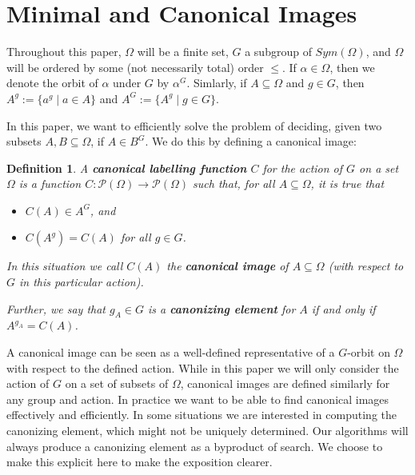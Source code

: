 \documentclass[preprint,12pt]{elsarticle}
\newtheorem{hyp}[theorem]{Hypothesis}
\newtheorem{defi}[theorem]{Definition}
\newcommand{\Sym}[1]{\ensuremath{Sym(#1)}}
\newcommand{\powset}{\mathcal{P}}
\begin{document}


\section{Minimal and Canonical Images}

Throughout this paper, $\Omega$ will be a finite set, $G$ a subgroup of
$\Sym{\Omega}$, and $\Omega$ will be ordered by some (not necessarily total)
order $\leq$.
If $\alpha \in \Omega$, then we denote the orbit of $\alpha$ under $G$ by $\alpha^G$.
Simlarly, if \(A \subseteq \Omega\) and $g \in G$, then 
\(A^g := \{a^g \mid a \in A\}\) and \(A^G := \{ A^g \mid g \in G \}\).

In this paper, we want to efficiently solve the problem of deciding, given two subsets
\(A,B \subseteq \Omega\), if \(A \in B^G\). We do this by defining a canonical image:

\begin{defi}
  A \textbf{canonical labelling function} $C$ for the action of $G$ on a set $\Omega$ is a function
  $C:\powset(\Omega) \rightarrow \powset(\Omega)$ such that, for all $A  \subseteq \Omega$,
  it is true that
  \begin{itemize}
  \item $C(A) \in A^G$, and
  \item ${C(A^g)} = C(A)$ for all $g \in G$.
  \end{itemize}

  In this situation we call $C(A)$ the \textbf{canonical image} of
  $A \subseteq  \Omega$ (with respect to $G$ in this particular action).

  Further, we say that $g_A \in G$ is a \textbf{canonizing element} for \(A\) if and only if
  $A^{g_A} = C(A)$.
\end{defi}


A canonical image can be seen as a well-defined
representative of a $G$-orbit on $\Omega$ with respect to the defined action. While in this
paper we will only consider the action of \(G\) on a set of subsets of \(\Omega\), canonical images are
defined similarly for any group and action.
In practice we want to be able to find canonical images effectively and
efficiently.
In some situations we are interested in computing the canonizing element,
which might not be uniquely determined. Our algorithms will always produce a
canonizing element as a byproduct of search.
We choose to make this explicit here to make the exposition clearer.
\end{document}
